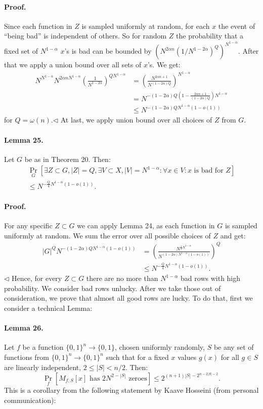 \documentclass[10pt,a4paper]{article}
\begin{document}
\paragraph{Proof.} Since each function in $Z$ is sampled uniformly at random, for each $x$ the event of ``being bad'' is independent of others. So for random $Z$ the probability that a fixed set of $N^{1-\alpha}$ $x$'s is bad can be bounded by $(N^{2\alpha n}(1/N^{1-2\alpha})^Q)^{N^{1-\alpha}}$. After that we apply a union bound over all sets of $x$'s.
We get:
\begin{align*}
N^{N^{1-\alpha}}N^{2\alpha nN^{1-\alpha}}\left(\frac1{N^{1-2\alpha}}\right)^{QN^{1-\alpha}}
&=\left(\frac{N^{2\alpha n+1}}{N^{(1-2\alpha)Q}}\right)^{N^{1-\alpha}}\\
&=N^{-(1-2\alpha)Q(1-\frac{2\alpha n+1}{(1-2\alpha)Q})N^{1-\alpha}}\\
&\leq N^{-(1-2\alpha)QN^{1-\alpha}(1-o(1))}
\end{align*}
for $Q=\omega(n)$.\hfill$\triangleleft$
At last, we apply union bound over all choices of $Z$ from $G$.
\paragraph{Lemma 25.} Let $G$ be as in Theorem 20. Then:
\begin{multline*}
\Pr_G[\exists Z\subset G,|Z|=Q,\exists V\subset X,|V|=N^{1-\alpha}:\forall x\in V:x\text{ is bad for }Z]\\
\leq N^{-\frac Q4N^{1-\alpha}(1-o(1))}.
\end{multline*}
\paragraph{Proof.} For any specific $Z\subset G$ we can apply Lemma 24, as each function in $G$ is sampled uniformly at random. We sum the error over all possible choices of $Z$ and get:
\begin{align*}
|G|^QN^{-(1-2\alpha)QN^{1-\alpha}(1-o(1))}
&=\left(\frac{N^{\frac14N^{1-\alpha}}}{N^{(1-2\alpha)N^{1-\alpha}(1-o(1))}}\right)^Q\\
&\leq N^{-\frac Q4N^{1-\alpha}(1-o(1))}.
\end{align*}\hfill$\triangleleft$
Hence, for every $Z\subset G$ there are no more than $N^{1-\alpha}$ bad rows with high probability.
We consider bad rows unlucky. After we take those out of consideration, we prove that almost all good rows are lucky.
To do that, first we consider a technical Lemma:
\paragraph{Lemma 26.} Let $f$ be a function $\{0,1\}^n\to\{0,1\}$, chosen uniformly randomly, $S$ be any set of functions from $\{0,1\}^n\to\{0,1\}^n$ such that for a fixed $x$ values $g(x)$ for all $g\in S$ are linearly independent, $2\leq|S|<n/2$. Then:
\[\Pr_f[M_{f,S}[x]\text{ has }2N^{2-|S|}\text{ zeroes}]\leq2^{(n+1)|S|-2^{n-2|S|-2}}.\]
This is a corollary from the following statement by Kaave Hosseini (from personal communication):
\end{document}
